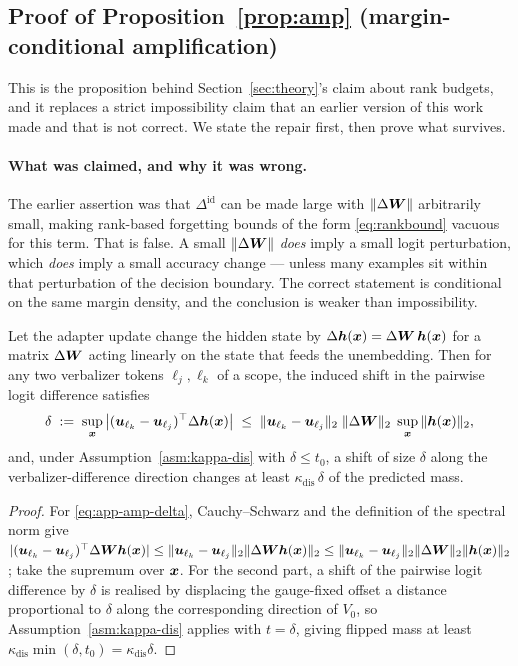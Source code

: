 \subsection{Proof of Proposition~\ref{prop:amp} (margin-conditional amplification)}
\label{app:proof-amp}

This is the proposition behind Section~\ref{sec:theory}'s claim about rank budgets,
and it replaces a strict impossibility claim that an earlier version of this work
made and that is not correct. We state the repair first, then prove what survives.

\paragraph{What was claimed, and why it was wrong.}
The earlier assertion was that $\Delta^{\mathrm{id}}$ can be made large with
$\|\Delta\bm{W}\|$ arbitrarily small, making rank-based forgetting bounds of the form
\eqref{eq:rankbound} vacuous for this term. That is false. A small $\|\Delta\bm{W}\|$
\emph{does} imply a small logit perturbation, which \emph{does} imply a small
accuracy change --- unless many examples sit within that perturbation of the decision
boundary. The correct statement is conditional on the same margin density, and the
conclusion is weaker than impossibility.

\begin{proposition}
\label{prop:amp-restated}
Let the adapter update change the hidden state by $\Delta\bm{h}(\bm{x})=\Delta\bm{W}\,\bm{h}(\bm{x})$
for a matrix $\Delta\bm{W}$ acting linearly on the state that feeds the unembedding.
Then for any two verbalizer tokens $\ell_j,\ell_k$ of a scope, the induced shift in
the pairwise logit difference satisfies
\begin{equation}
  \delta \;:=\; \sup_{\bm{x}}\big|(\bm{u}_{\ell_k}-\bm{u}_{\ell_j})^\top\Delta\bm{h}(\bm{x})\big|
  \;\le\; \|\bm{u}_{\ell_k}-\bm{u}_{\ell_j}\|_2\;\|\Delta\bm{W}\|_2\;\sup_{\bm{x}}\|\bm{h}(\bm{x})\|_2 ,
  \label{eq:app-amp-delta}
\end{equation}
and, under Assumption~\ref{asm:kappa-dis} with $\delta\le t_0$, a shift of size
$\delta$ along the verbalizer-difference direction changes at least
$\kappa_{\mathrm{dis}}\,\delta$ of the predicted mass.
\end{proposition}

\begin{proof}
For \eqref{eq:app-amp-delta}, Cauchy--Schwarz and the definition of the spectral
norm give
$|(\bm{u}_{\ell_k}-\bm{u}_{\ell_j})^\top\Delta\bm{W}\bm{h}(\bm{x})|
\le\|\bm{u}_{\ell_k}-\bm{u}_{\ell_j}\|_2\|\Delta\bm{W}\bm{h}(\bm{x})\|_2
\le\|\bm{u}_{\ell_k}-\bm{u}_{\ell_j}\|_2\|\Delta\bm{W}\|_2\|\bm{h}(\bm{x})\|_2$;
take the supremum over $\bm{x}$. For the second part, a shift of the pairwise logit
difference by $\delta$ is realised by displacing the gauge-fixed offset a distance
proportional to $\delta$ along the corresponding direction of $V_0$, so
Assumption~\ref{asm:kappa-dis} applies with $t=\delta$, giving flipped mass at
least $\kappa_{\mathrm{dis}}\min(\delta,t_0)=\kappa_{\mathrm{dis}}\delta$.
\end{proof}

